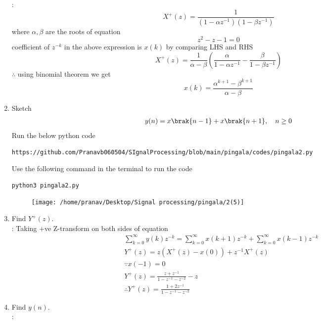 \documentclass[journal,12pt,twocolumn]{IEEEtran}
\renewcommand\thesection{\arabic{section}}
\begin{document}
\begin{enumerate}[label=\thesection.\arabic*,ref=\thesection.\theenumi]
	\solution:
	\begin{equation}
	X^{+}(z)=\frac{1}{(1-\alpha z^{-1})(1-\beta z^{-1})}
	\end{equation}
	where $\alpha,\beta$ are the roots of equation
	\begin{equation}
	z^2-z-1=0
	\end{equation}
	coefficient of $z^{-k}$ in the above expression is $x(k)$ by comparing LHS and RHS\\
	\begin{equation}
	X^{+}(z)=\frac{1}{\alpha-\beta}\left(\frac{\alpha}{1-\alpha z^{-1}}-\frac{\beta}{1-\beta z^{-1}}\right)
	\end{equation}
	$\therefore$ using binomial theorem we get
	\begin{equation} 
	x(k)=\frac{\alpha^{k+1}-\beta^{k+1}}{\alpha - \beta}
	\end{equation}
	\item Sketch 
\begin{align}
	y(n)	 = x\brak{n-1} + x\brak{n+1},  \quad n \ge 0
\end{align}
\solution
Run the below python code 
\begin{lstlisting}
https://github.com/Pranavb060504/SIgnalProcessing/blob/main/pingala/codes/pingala2.py
\end{lstlisting}
Use the following command in the terminal to run the code
\begin{lstlisting}
python3 pingala2.py
\end{lstlisting}
\begin{figure}[h]
\centering
\texttt{[image: /home/pranav/Desktop/Signal processing/pingala/2(5)]}
\caption{}
\end{figure}
	\item Find $Y^{+}(z)$.
	\\
	\solution:
	Taking +ve Z-transform on both sides of equation 
	\begin{align}
	&\sum_{k=0}^{\infty}y(k)z^{-k}=\sum_{k=0}^{\infty}x(k+1)z^{-k}+\sum_{k=0}^{\infty}x(k-1)z^{-k}\\
	&Y^{+}(z)=z(X^{+}(z)-x(0))+z^{-1}X^{+}(z)\\
	&\because x(-1)=0 \nonumber \\
	&Y^{+}(z)=\frac{z+z^{-1}}{1-z^{-1}-z^{-2}}-z\\
	&\therefore Y^{+}(z)=\frac{1+2z^{-1}}{1-z^{-1}-z^{-2}}
	\end{align}
\item Find $y(n)$.\\
\solution:

\end{enumerate}
\end{document}
